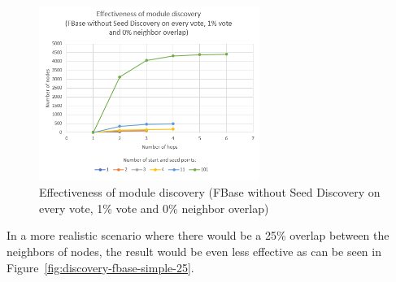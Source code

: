 \begin{figure}[ht!]
	\centering
	\includegraphics[width=0.64\textwidth]{images/discovery-fbase-simple-0.png}
	\caption{\label{fig:discovery-fbase-simple-0} Effectiveness of module discovery (FBase without Seed Discovery on every vote, 1\% vote and 0\% neighbor overlap)}
\end{figure}


In a more realistic scenario where there would be a 25\% overlap between the neighbors of nodes, the result would be even less effective as can be seen in Figure~\ref{fig:discovery-fbase-simple-25}.

